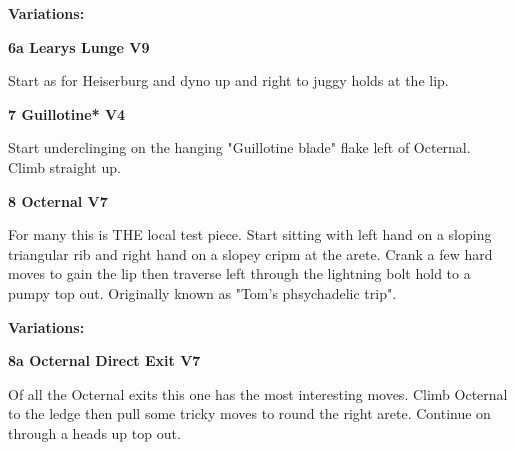\begin{multicols}{2}
				\begin{adjustwidth}{0.5cm}{}				
				\needspace{3cm}
				\textbf{Variations:} \newline
					
					\needspace{1.5cm}
\label{vr:Learys Lunge}
\colorbox{Goldenrod!50}{
\parbox{0.95\linewidth}{
\textbf{
6a Learys Lunge V9  
}}}

					\begin{adjustwidth}{0.5cm}{}			
					Start as for Heiserburg and dyno up and right to juggy holds at the lip.
					\end{adjustwidth}
					
					
				\end{adjustwidth}
			
			
			\needspace{1.5cm}
\label{rt:Guillotine}
\colorbox{RoyalBlue!20}{
\parbox{0.95\linewidth}{
\textbf{
7 Guillotine* V4  
}}}

			\begin{adjustwidth}{0.5cm}{}			
			Start underclinging on the hanging "Guillotine blade" flake left of Octernal. Climb straight up.
			\end{adjustwidth}
			
			
			
			\needspace{1.5cm}
\label{rt:Octernal}
\colorbox{Goldenrod!50}{
\parbox{0.95\linewidth}{
\textbf{
8 Octernal V7  
}}}

			\begin{adjustwidth}{0.5cm}{}			
			For many this is THE local test piece. Start sitting with left hand on a sloping triangular rib and right hand on a slopey cripm at the arete. Crank a few hard moves to gain the lip then traverse left through the lightning bolt hold to a pumpy top out. Originally known as "Tom's phsychadelic trip".
			\end{adjustwidth}
			
				\begin{adjustwidth}{0.5cm}{}				
				\needspace{3cm}
				\textbf{Variations:} \newline
					
					\needspace{1.5cm}
\label{vr:Octernal Direct Exit}
\colorbox{Goldenrod!50}{
\parbox{0.95\linewidth}{
\textbf{
8a Octernal Direct Exit V7  
}}}

					\begin{adjustwidth}{0.5cm}{}			
					Of all the Octernal exits this one has the most interesting moves. Climb Octernal to the ledge then pull some tricky moves to round the right arete. Continue on through a heads up top out.
					\end{adjustwidth}
					

\end{adjustwidth}
\end{multicols}
